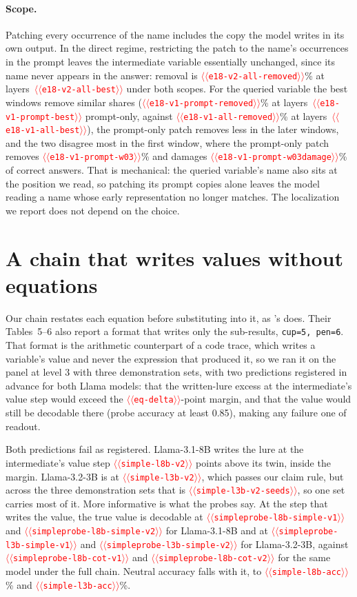 \documentclass[11pt]{article}
\providecommand{\NUM}[1]{\textcolor{red}{$\langle\langle$\texttt{#1}$\rangle\rangle$}}
\begin{document}
\paragraph{Scope.} Patching every occurrence of the name includes the copy the model writes in
its own output. In the direct regime, restricting the patch to the name's occurrences in the prompt leaves the
intermediate variable essentially unchanged, since its name never appears in the answer: removal is
\NUM{e18-v2-all-removed}\% at layers~\NUM{e18-v2-all-best} under both scopes. For the queried
variable the best windows remove similar shares (\NUM{e18-v1-prompt-removed}\% at
layers~\NUM{e18-v1-prompt-best} prompt-only, against \NUM{e18-v1-all-removed}\% at
layers~\NUM{e18-v1-all-best}), the prompt-only patch removes less in the later windows, and the
two disagree most in the first window, where the prompt-only patch removes
\NUM{e18-v1-prompt-w03}\% and damages \NUM{e18-v1-prompt-w03damage}\% of correct answers. That
is mechanical: the queried variable's name also sits at the position we read, so patching its
prompt copies alone leaves the model reading a name whose early representation no longer
matches. The localization we report does not depend on the choice.

\section{A chain that writes values without equations}
\label{app:simple}

Our chain restates each equation before substituting into it, as
\citeauthor{kudo2026faithful}'s does. Their Tables~5--6 also report a format that writes only the
sub-results, \texttt{cup=5, pen=6}. That format is the arithmetic counterpart of a code trace,
which writes a variable's value and never the expression that produced it, so we ran it on the
panel at level 3 with three demonstration sets, with two predictions registered in advance for both Llama models: that
the written-lure excess at the intermediate's value step would exceed the \NUM{eq-delta}-point
margin, and that the value would still be decodable there (probe accuracy at least 0.85), making
any failure one of readout.

Both predictions fail as registered. Llama-3.1-8B writes the lure at the intermediate's value
step \NUM{simple-l8b-v2} points above its twin, inside the margin. Llama-3.2-3B is at
\NUM{simple-l3b-v2}, which passes our claim rule, but across the three demonstration sets that
is \NUM{simple-l3b-v2-seeds}, so one set carries most of it. More informative is what the probes say. At
the step that writes the value, the true value is decodable at \NUM{simpleprobe-l8b-simple-v1}
and \NUM{simpleprobe-l8b-simple-v2} for Llama-3.1-8B and at
\NUM{simpleprobe-l3b-simple-v1} and \NUM{simpleprobe-l3b-simple-v2} for Llama-3.2-3B, against
\NUM{simpleprobe-l8b-cot-v1} and \NUM{simpleprobe-l8b-cot-v2} for the same model under the full
chain. Neutral accuracy falls with it, to \NUM{simple-l8b-acc}\% and \NUM{simple-l3b-acc}\%.
\end{document}

